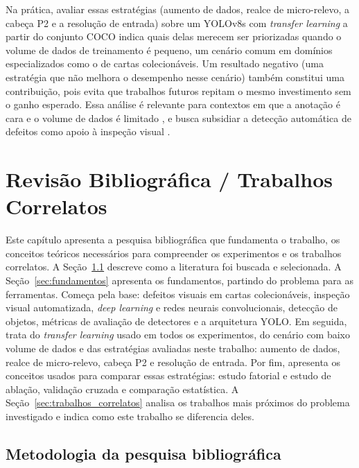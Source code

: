 \documentclass[
    12pt,                %
    openright,           %
    oneside,             %
    a4paper,             %
    english,             %
    brazil               %
]{abntex2}
\begin{document}
Na prática, avaliar essas estratégias (aumento de dados, realce de
micro-relevo, a cabeça P2 e a resolução de
entrada) sobre um YOLOv8s com \textit{transfer learning} a partir do
conjunto COCO indica quais delas merecem ser priorizadas quando o
volume de dados de treinamento é pequeno, um cenário comum em domínios
especializados como o de cartas colecionáveis. Um resultado negativo
(uma estratégia que não melhora o desempenho nesse cenário) também
constitui uma contribuição, pois evita que trabalhos futuros repitam o
mesmo investimento sem o ganho esperado. Essa análise é relevante para
contextos em que a anotação é cara e o volume de dados é limitado
\cite{Situ2023, Chen2021}, e busca subsidiar a detecção automática de
defeitos como apoio à inspeção visual \cite{Nahar2025}.

\chapter{Revisão Bibliográfica / Trabalhos Correlatos}
\label{cap:revisao}

Este capítulo apresenta a pesquisa bibliográfica que fundamenta o
trabalho, os conceitos teóricos necessários para compreender os
experimentos e os trabalhos correlatos. A
Seção~\ref{sec:metodologia_pesquisa_bib} descreve como a literatura foi
buscada e selecionada. A Seção~\ref{sec:fundamentos} apresenta os
fundamentos, partindo do problema para as ferramentas. Começa pela base:
defeitos visuais em cartas colecionáveis, inspeção visual automatizada,
\textit{deep learning} e redes neurais convolucionais, detecção de objetos, métricas
de avaliação de detectores e a arquitetura YOLO. Em seguida, trata do
\textit{transfer learning} usado em todos os experimentos, do cenário
com baixo volume de dados e das estratégias avaliadas neste trabalho:
aumento de dados, realce de micro-relevo, cabeça P2 e resolução de
entrada. Por fim, apresenta os
conceitos usados para comparar essas estratégias: estudo fatorial e
estudo de ablação, validação cruzada e comparação estatística. A
Seção~\ref{sec:trabalhos_correlatos} analisa os trabalhos mais próximos
do problema investigado e indica como este trabalho se diferencia
deles.

\section{Metodologia da pesquisa bibliográfica}
\label{sec:metodologia_pesquisa_bib}
\end{document}
